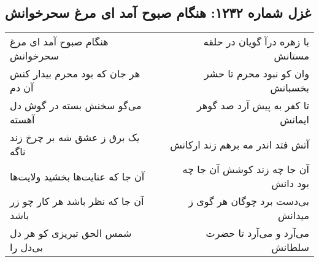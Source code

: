 \begin{center}
\section*{غزل شماره ۱۲۳۲: هنگام صبوح آمد ای مرغ سحرخوانش}
\label{sec:1232}
\begin{longtable}{l p{0.5cm} r}
هنگام صبوح آمد ای مرغ سحرخوانش
&&
با زهره درآ گویان در حلقه مستانش
\\
هر جان که بود محرم بیدار کنش آن دم
&&
وان کو نبود محرم تا حشر بخسبانش
\\
می‌گو سخنش بسته در گوش دل آهسته
&&
تا کفر به پیش آرد صد گوهر ایمانش
\\
یک برق ز عشق شه بر چرخ زند ناگه
&&
آتش فتد اندر مه برهم زند ارکانش
\\
آن جا که عنایت‌ها بخشید ولایت‌ها
&&
آن جا چه زند کوشش آن جا چه بود دانش
\\
آن جا که نظر باشد هر کار چو زر باشد
&&
بی‌دست برد چوگان هر گوی ز میدانش
\\
شمس الحق تبریزی کو هر دل بی‌دل را
&&
می‌آرد و می‌آرد تا حضرت سلطانش
\\
\end{longtable}
\end{center}
